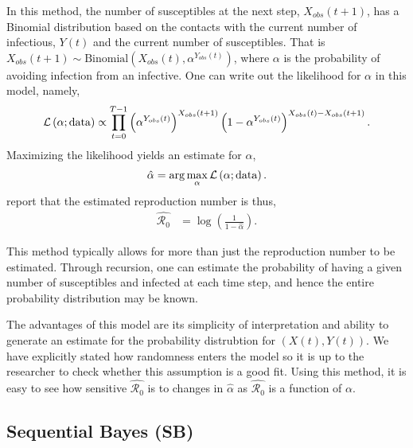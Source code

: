 \documentclass[12pt]{article}
\newcommand{\rr}{\ensuremath{\mathcal{R}_0}}
\begin{document}
In this method, the number of susceptibles at the next step, $X_{obs}(t+1)$, has a Binomial distribution based on the contacts with the current number of infectious, $Y(t)$ and the current number of susceptibles.  That is $X_{obs}(t+1) \sim \text{Binomial}\left(X_{obs}(t), \alpha^{Y_{obs}(t)}\right)$, where $\alpha$ is the probability of avoiding infection from an infective.  One can write out the likelihood for $\alpha$ in this model, namely,
\begin{align*}
\mathcal{L}\left ( \alpha ; \textnormal{data}\right ) \propto \prod_{t=0}^{T-1}\left ( \alpha^{Y_{obs}(t)} \right )^{X_{obs}(t+1)} \left (1- \alpha^{Y_{obs}(t)} \right )^{X_{obs}(t) - X_{obs}(t+1)}.
\end{align*}
Maximizing the likelihood yields an estimate for $\alpha$,
\begin{align*}
\hat{\alpha} = \arg \max_{\alpha} \mathcal{L}\left(\alpha; \textnormal{data} \right ).
  \end{align*}
 \cite{barbour2004} report that the estimated reproduction number is thus,
\begin{align}\label{eq:r0-mc}
\hat{\rr} &= \log \left ( \frac{1}{1-\hat{\alpha}}\right ).
\end{align}

This method typically allows for more than just the reproduction number to be estimated.  Through recursion, one can estimate the probability of having a given number of susceptibles and infected at each time step, and hence the entire probability distribution may be known.

The advantages of this model are its simplicity of interpretation and ability to generate an estimate for the probability distrubtion for $(X(t), Y(t))$.  We have explicitly stated how randomness enters the model so it is up to the researcher to check whether this assumption is a good fit.  Using this method, it is easy to see how sensitive $\hat{\rr}$ is to changes in $\hat{\alpha}$ as $\hat{\rr}$ is a function of $\alpha$.





\subsection{Sequential Bayes (SB)}\label{sec:seqbayes}
\end{document}
